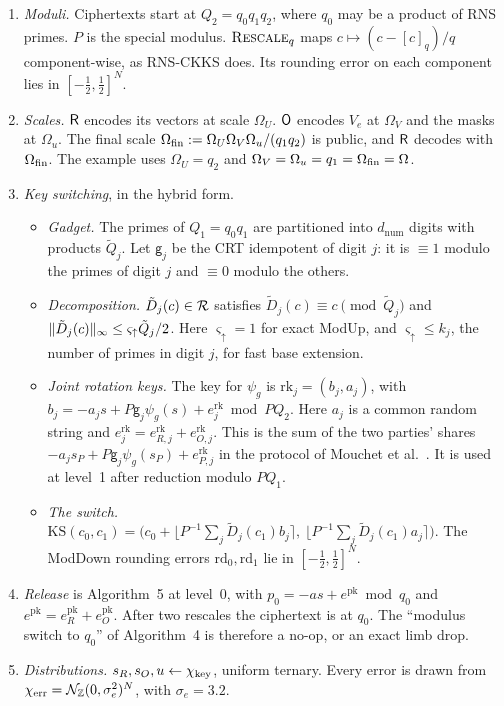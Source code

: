 \begin{enumerate}[nosep,label=(M\arabic*)]
  \item \emph{Moduli.} Ciphertexts start at $Q_2=q_0q_1q_2$, where $q_0$ may be a product of RNS primes. $P$ is the special modulus. $\textsc{Rescale}_{q}$ maps $c\mapsto(c-[c]_q)/q$ component-wise, as RNS-CKKS does. Its rounding error on each component lies in $[-\frac12,\frac12]^N$.
  \item \emph{Scales.} $\mathsf{R}$ encodes its vectors at scale $\Omega_U$. $\mathsf{O}$ encodes $V_e$ at $\Omega_V$ and the masks at $\Omega_u$. The final scale $\Omega_{\mathrm{fin}}:=\Omega_U\Omega_V\Omega_u/(q_1q_2)$ is public, and $\mathsf{R}$ decodes with $\Omega_{\mathrm{fin}}$. The example uses $\Omega_U=q_2$ and $\Omega_V=\Omega_u=q_1=\Omega_{\mathrm{fin}}=\Omega$.
  \item \emph{Key switching}, in the hybrid form.
  \begin{itemize}[nosep]
    \item \emph{Gadget.} The primes of $Q_1=q_0q_1$ are partitioned into $d_{\mathrm{num}}$ digits with products $\tilde Q_j$. Let $\mathsf g_j$ be the CRT idempotent of digit $j$: it is $\equiv1$ modulo the primes of digit $j$ and $\equiv0$ modulo the others.
    \item \emph{Decomposition.} $\tilde D_j(c)\in\mathcal{R}$ satisfies $\tilde D_j(c)\equiv c\pmod{\tilde Q_j}$ and $\lVert \tilde D_j(c)\rVert_\infty\le\varsigma_{\uparrow}\tilde Q_j/2$. Here $\varsigma_\uparrow=1$ for exact ModUp, and $\varsigma_\uparrow\le k_j$, the number of primes in digit $j$, for fast base extension.
    \item \emph{Joint rotation keys.} The key for $\psi_g$ is $\mathrm{rk}_j=(b_j,a_j)$, with $b_j=-a_js+P\mathsf g_j\psi_g(s)+e^{\mathrm{rk}}_j\bmod PQ_2$. Here $a_j$ is a common random string and $e^{\mathrm{rk}}_j=e^{\mathrm{rk}}_{R,j}+e^{\mathrm{rk}}_{O,j}$. This is the sum of the two parties' shares $-a_js_P+P\mathsf g_j\psi_g(s_P)+e^{\mathrm{rk}}_{P,j}$ in the protocol of Mouchet et al.~\cite{MTBH21}. It is used at level~1 after reduction modulo $PQ_1$.
    \item \emph{The switch.} $\mathrm{KS}(c_0,c_1)=\bigl(c_0+\lfloor P^{-1}\sum_j\tilde D_j(c_1)b_j\rceil,\ \lfloor P^{-1}\sum_j\tilde D_j(c_1)a_j\rceil\bigr)$. The ModDown rounding errors $\mathrm{rd}_0,\mathrm{rd}_1$ lie in $[-\frac12,\frac12]^N$.
  \end{itemize}
  \item \emph{Release} is Algorithm~5 at level~0, with $p_0=-as+e^{\mathrm{pk}}\bmod q_0$ and $e^{\mathrm{pk}}=e^{\mathrm{pk}}_R+e^{\mathrm{pk}}_O$. After two rescales the ciphertext is at $q_0$. The ``modulus switch to $q_0$'' of Algorithm~4 is therefore a no-op, or an exact limb drop.
  \item \emph{Distributions.} $s_R,s_O,u\gets\chi_{\mathrm{key}}$, uniform ternary. Every error is drawn from $\chi_{\mathrm{err}}=\mathcal{N}_{\mathbb{Z}}(0,\sigma_e^2)^N$, with $\sigma_e=3.2$.
\end{enumerate}

